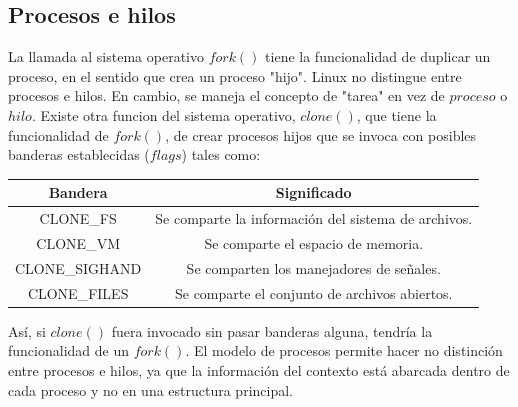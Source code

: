 \documentclass[spanish]{article}
\begin{document}
\subsection{Procesos e hilos}

La llamada al sistema operativo $fork()$ tiene la funcionalidad de duplicar un proceso, en el sentido que crea un proceso "hijo". Linux no distingue entre procesos e hilos. En cambio, se maneja el concepto de "tarea" en vez de $proceso$ o $hilo$. Existe otra funcion del sistema operativo, $clone()$, que tiene la funcionalidad de $fork()$, de crear procesos hijos que se invoca con posibles banderas establecidas ($flags$) tales como: \cite{clone2-manual}

\begin{center}
\begin{tabular}{|c |c |}
  \hline
  Bandera & Significado\\
  \hline
  CLONE\_FS & Se comparte la informaci\'{o}n del sistema de archivos.\\
  CLONE\_VM & Se comparte el espacio de memoria. \\
  CLONE\_SIGHAND & Se comparten los manejadores de se\~{n}ales. \\
  CLONE\_FILES & Se comparte el conjunto de archivos abiertos. \\
  \hline
\end{tabular}
\end{center}

As\'{i}, si $clone()$ fuera invocado sin pasar banderas alguna, tendr\'{i}a la funcionalidad de un $fork()$. El modelo de procesos permite hacer no distinci\'{o}n entre procesos e hilos, ya que la informaci\'{o}n del contexto est\'{a} abarcada dentro de cada proceso y no en una estructura principal.

\end{document}
